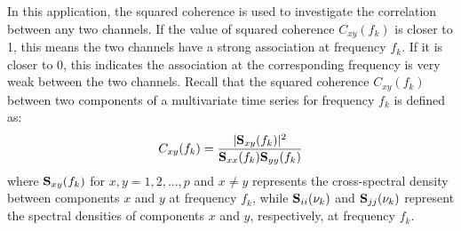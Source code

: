 \documentclass[%
 reprint,
 amsmath,amssymb,
 aps,
 nofootinbib,
]{revtex4-2}
\begin{document}
In this application, the squared coherence is used to investigate the correlation between any two channels. If the value of squared coherence $C_{xy}(f_k)$ is closer to 1, this means the two channels have a strong association at frequency $f_k$. If it is closer to 0, this indicates the association at the corresponding frequency is very weak between the two channels. Recall that the squared coherence $C_{xy}(f_k)$ between two components of a multivariate time series for frequency $f_k$ is defined as:
\begin{align}\label{squared coh}
C_{xy}(f_k) = \frac{|\S_{xy}(f_k)|^2}{\S_{xx}(f_k)\S_{yy}(f_k)}
\end{align}
where $\S_{xy}(f_k)$ for $x,y = 1,2,...,p$ and $x\neq y$ represents the cross-spectral density between components $x$ and $y$ at frequency $f_k$, while $\S_{ii}(\nu_k)$ and $\S_{jj}(\nu_k)$ represent the spectral densities of components $x$ and $y$, respectively, at frequency $f_k$.
\end{document}
